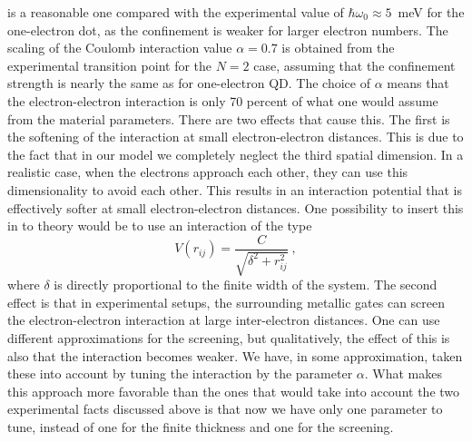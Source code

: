 \documentclass{article}
\begin{document}
is a reasonable one compared with the experimental value of
$\hbar\omega_0\approx 5$~meV for the one-electron dot, as the
confinement is weaker for larger electron numbers. The scaling of the
Coulomb interaction value $\alpha=0.7$ is obtained from the
experimental transition point for the $N=2$ case, assuming that the
confinement strength is nearly the same as for one-electron QD. The
choice of $\alpha$ means that the electron-electron interaction is
only 70 percent of what one would assume from the material
parameters. There are two effects that cause this. The first is the
softening of the interaction at small electron-electron
distances. This is due to the fact that in our model we completely
neglect the third spatial dimension. In a realistic case, when the
electrons approach each other, they can use this dimensionality to
avoid each other. This results in an interaction potential that is
effectively softer at small electron-electron distances. One
possibility to insert this in to theory would be to use an interaction
of the type
\begin{equation}
V(r_{ij})=\frac{C}{\sqrt{\delta^2+r_{ij}^2}} \ ,
\end{equation}
where $\delta$ is directly proportional to the finite width of the
system.  The second effect is that in experimental setups, the
surrounding metallic gates can screen the electron-electron
interaction at large inter-electron distances. One can use different
approximations for the screening, but qualitatively, the effect of
this is also that the interaction becomes weaker.  We have, in some
approximation, taken these into account by tuning the interaction by
the parameter $\alpha$. What makes this approach more favorable than
the ones that would take into account the two experimental facts
discussed above is that now we have only one parameter to tune,
instead of one for the finite thickness and one for the screening.
\end{document}
